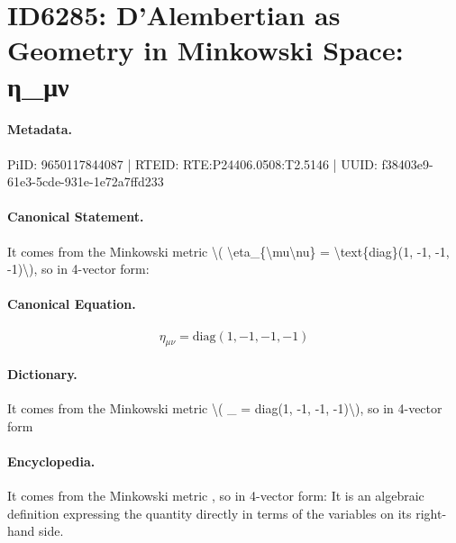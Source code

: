 \section*{ID6285: D’Alembertian as Geometry in Minkowski Space: η\_μν}
\paragraph{Metadata.}
PiID: 9650117844087 | RTEID: RTE:P24406.0508:T2.5146 | UUID: f38403e9-61e3-5cde-931e-1e72a7ffd233

\paragraph{Canonical Statement.}
It comes from the Minkowski metric \textbackslash{}( \textbackslash{}eta\_\{\textbackslash{}mu\textbackslash{}nu\} = \textbackslash{}text\{diag\}(1, -1, -1, -1)\textbackslash{}), so in 4-vector form:

\paragraph{Canonical Equation.}
\[
\eta_{\mu\nu} = \text{diag}(1, -1, -1, -1)
\]

\paragraph{Dictionary.}
It comes from the Minkowski metric \textbackslash{}( \_ = diag(1, -1, -1, -1)\textbackslash{}), so in 4-vector form

\paragraph{Encyclopedia.}
It comes from the Minkowski metric , so in 4-vector form: It is an algebraic definition expressing the quantity directly in terms of the variables on its right-hand side.
